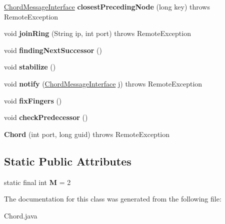 \begin{DoxyCompactItemize}
\mbox{\label{class_chord_aecd3971877558c3b1290bd49d7576ab0}} 
\mbox{\hyperlink{interface_chord_message_interface}{Chord\+Message\+Interface}} {\bfseries closest\+Preceding\+Node} (long key)  throws Remote\+Exception 
\item 
\mbox{\label{class_chord_ace0b8d2768590d7527af155c6573cae7}} 
void {\bfseries join\+Ring} (String ip, int port)  throws Remote\+Exception 
\item 
\mbox{\label{class_chord_a65c855dc1d8c6a82545899cb823dba2e}} 
void {\bfseries finding\+Next\+Successor} ()
\item 
\mbox{\label{class_chord_a8a4b7a1cd88cb3f607ada0629f2ff2dd}} 
void {\bfseries stabilize} ()
\item 
\mbox{\label{class_chord_a4de8b8464782dd96d88deeb35b2f27a2}} 
void {\bfseries notify} (\mbox{\hyperlink{interface_chord_message_interface}{Chord\+Message\+Interface}} j)  throws Remote\+Exception 
\item 
\mbox{\label{class_chord_a02763f74bbd986baa7e6567bf9dc3c95}} 
void {\bfseries fix\+Fingers} ()
\item 
\mbox{\label{class_chord_a530b2ab58c9f4026dadf4293c38c4450}} 
void {\bfseries check\+Predecessor} ()
\item 
\mbox{\label{class_chord_a6e4b3112b0268455fd599c57b5479791}} 
{\bfseries Chord} (int port, long guid)  throws Remote\+Exception 
\end{DoxyCompactItemize}
\subsection*{Static Public Attributes}
\begin{DoxyCompactItemize}
\item 
\mbox{\label{class_chord_a864e0b4011dc157c78a06dd951c6d9ac}} 
static final int {\bfseries M} = 2
\end{DoxyCompactItemize}


The documentation for this class was generated from the following file\+:\begin{DoxyCompactItemize}
\item 
Chord.\+java\end{DoxyCompactItemize}

